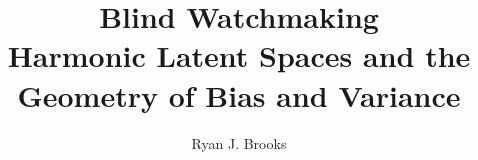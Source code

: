 \documentclass{article}
\begin{document}
\providecommand{\paperThreadAbstract}{}
\providecommand{\paperThreadIntroduction}{}
\providecommand{\paperThreadTheory}{}
\providecommand{\paperThreadConclusion}{}
\providecommand{\paperTitle}{Blind Watchmaking}
\providecommand{\paperSubtitle}{Harmonic Latent Spaces and the Geometry of Bias and Variance}
\title{\paperTitle\\[0.3em]
    \large \paperSubtitle}
\providecommand{\paperAuthors}{Ryan J. Brooks}
\author{\paperAuthors}
\date{}

\maketitle


\end{document}

